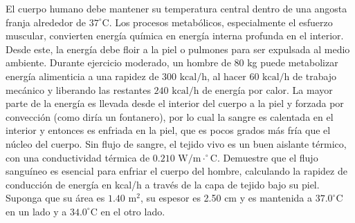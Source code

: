 \item El cuerpo humano debe mantener su temperatura central dentro de una angosta franja alrededor de $37^\circ\text{C}$. Los procesos metabólicos, especialmente el esfuerzo muscular, convierten energía química en energía interna profunda en el interior. Desde este, la energía debe floir a la piel o pulmones para ser expulsada al medio ambiente. Durante ejercicio moderado, un hombre de 80 kg puede metabolizar energía alimenticia a una rapidez de $300\text{ kcal/h}$, al hacer $60\text{ kcal/h}$ de trabajo mecánico y liberando las restantes $240\text{ kcal/h}$ de energía por calor. La mayor parte de la energía es llevada desde el interior del cuerpo a la piel y forzada por convección (como diría un fontanero), por lo cual la sangre es calentada en el interior y entonces es enfriada en la piel, que es pocos grados más fría que el núcleo del cuerpo. Sin flujo de sangre, el tejido vivo es un buen aislante térmico, con una conductividad térmica de $0.210\text{ W/m}\cdot^\circ\text{C}$. Demuestre que el flujo sanguíneo es esencial para enfriar el cuerpo del hombre, calculando la rapidez de conducción de energía en kcal/h a través de la capa de tejido bajo su piel. Suponga que su área es $1.40\text{ m}^2$, su espesor es 2.50 cm y es mantenida a $37.0^\circ\text{C}$ en un lado y a $34.0^\circ\text{C}$ en el otro lado.
